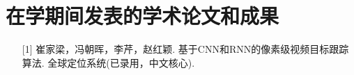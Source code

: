 
\chapter{在学期间发表的学术论文和成果}
\begin{itemize}
    \item[ {[}1{]} ] 崔家梁，冯朝晖，李芹，赵红颖. 基于CNN和RNN的像素级视频目标跟踪算法. 全球定位系统(已录用，中文核心).
\end{itemize}
